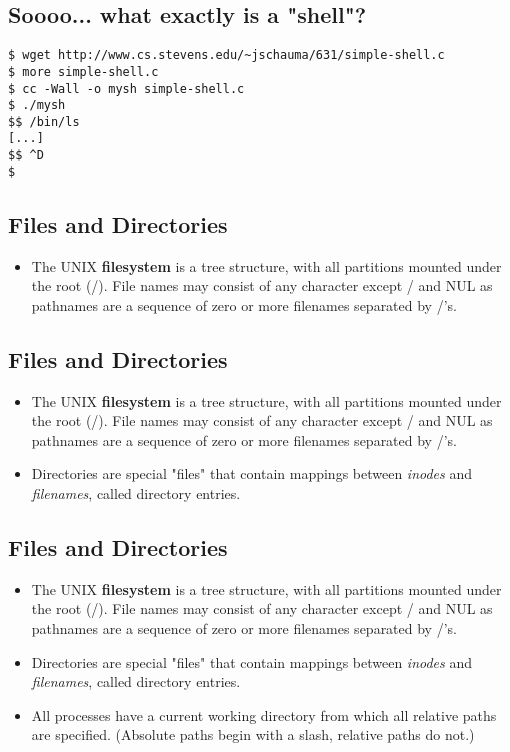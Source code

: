 \documentclass[sxga]{xdvislides}
\begin{document}
\subsection{Soooo... what exactly is a "shell"?}
\vspace*{\fill}
\begin{verbatim}
$ wget http://www.cs.stevens.edu/~jschauma/631/simple-shell.c
$ more simple-shell.c
$ cc -Wall -o mysh simple-shell.c
$ ./mysh
$$ /bin/ls
[...]
$$ ^D
$
\end{verbatim}
\vspace*{\fill}


\subsection{Files and Directories}
\begin{itemize}
	\item The UNIX {\bf filesystem} is a tree structure, with all partitions
		mounted under the root (/). File names may consist of any
		character except / and NUL as pathnames are a sequence of
		zero or more filenames separated by /'s.
\end{itemize}

\subsection{Files and Directories}
\begin{itemize}
	\item The UNIX {\bf filesystem} is a tree structure, with all partitions
		mounted under the root (/). File names may consist of any
		character except / and NUL as pathnames are a sequence of
		zero or more filenames separated by /'s.
	\item Directories are special "files" that contain mappings
		between {\em inodes} and {\em filenames}, called directory
		entries.
\end{itemize}


\subsection{Files and Directories}
\begin{itemize}
	\item The UNIX {\bf filesystem} is a tree structure, with all partitions
		mounted under the root (/). File names may consist of any
		character except / and NUL as pathnames are a sequence of
		zero or more filenames separated by /'s.
	\item Directories are special "files" that contain mappings
		between {\em inodes} and {\em filenames}, called directory
		entries.
	\item All processes have a current working directory from which
		all relative paths are specified. (Absolute paths begin
		with a slash, relative paths do not.)
\end{itemize}
\end{document}
